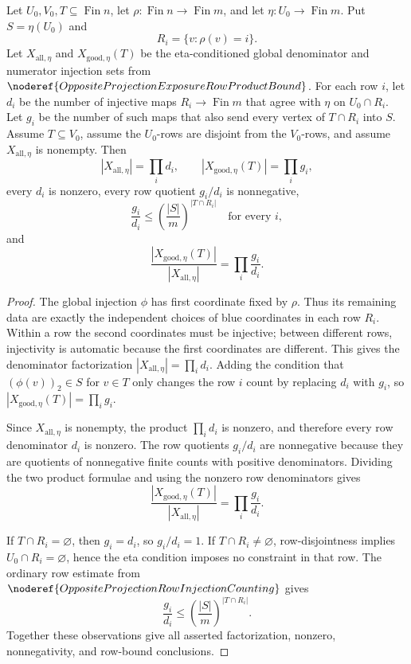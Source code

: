 \begin{helper}
Let \(U_0,V_0,T\subseteq\operatorname{Fin}n\), let
\(\rho:\operatorname{Fin}n\to\operatorname{Fin}m\), and let
\(\eta:U_0\to\operatorname{Fin}m\).  Put \(S=\eta(U_0)\) and
\[
R_i=\{v:\rho(v)=i\}.
\]
Let \(X_{\mathrm{all},\eta}\) and \(X_{\mathrm{good},\eta}(T)\) be the
eta-conditioned global denominator and numerator injection sets from
\(\noderef{OppositeProjectionExposureRowProductBound}\).  For each row
\(i\), let \(d_i\) be the number of injective maps \(R_i\to\operatorname{Fin}m\)
that agree with \(\eta\) on \(U_0\cap R_i\).  Let \(g_i\) be the number of
such maps that also send every vertex of \(T\cap R_i\) into \(S\).  Assume
\(T\subseteq V_0\), assume the \(U_0\)-rows are disjoint from the \(V_0\)-rows,
and assume \(X_{\mathrm{all},\eta}\) is nonempty.  Then
\[
|X_{\mathrm{all},\eta}|=\prod_i d_i,\qquad
|X_{\mathrm{good},\eta}(T)|=\prod_i g_i,
\]
every \(d_i\) is nonzero, every row quotient \(g_i/d_i\) is nonnegative,
\[
\frac{g_i}{d_i}\le \left(\frac{|S|}{m}\right)^{|T\cap R_i|}
\quad\text{for every }i,
\]
and
\[
\frac{|X_{\mathrm{good},\eta}(T)|}{|X_{\mathrm{all},\eta}|}
=\prod_i \frac{g_i}{d_i}.
\]
\end{helper}
\begin{proof}
The global injection \(\phi\) has first coordinate fixed by \(\rho\).  Thus
its remaining data are exactly the independent choices of blue coordinates in
each row \(R_i\).  Within a row the second coordinates must be injective;
between different rows, injectivity is automatic because the first
coordinates are different.  This gives the denominator factorization
\(|X_{\mathrm{all},\eta}|=\prod_i d_i\).  Adding the condition that
\((\phi(v))_2\in S\) for \(v\in T\) only changes the row \(i\) count by
replacing \(d_i\) with \(g_i\), so
\(|X_{\mathrm{good},\eta}(T)|=\prod_i g_i\).

Since \(X_{\mathrm{all},\eta}\) is nonempty, the product \(\prod_i d_i\) is
nonzero, and therefore every row denominator \(d_i\) is nonzero.  The row
quotients \(g_i/d_i\) are nonnegative because they are quotients of
nonnegative finite counts with positive denominators.  Dividing the two
product formulae and using the nonzero row denominators gives
\[
\frac{|X_{\mathrm{good},\eta}(T)|}{|X_{\mathrm{all},\eta}|}
=\prod_i \frac{g_i}{d_i}.
\]

If \(T\cap R_i=\varnothing\), then \(g_i=d_i\), so \(g_i/d_i=1\).  If
\(T\cap R_i\ne\varnothing\), row-disjointness implies
\(U_0\cap R_i=\varnothing\), hence the eta condition imposes no constraint in
that row.  The ordinary row estimate from
\(\noderef{OppositeProjectionRowInjectionCounting}\) gives
\[
\frac{g_i}{d_i}\le \left(\frac{|S|}{m}\right)^{|T\cap R_i|}.
\]
Together these observations give all asserted factorization, nonzero,
nonnegativity, and row-bound conclusions.
\end{proof}
